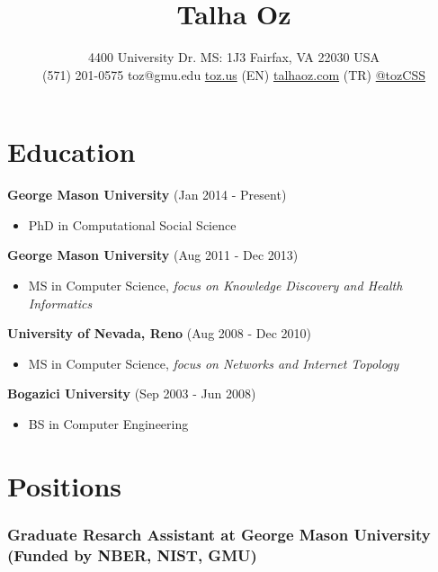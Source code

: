 \documentclass[11pt, letter]{article}
\title{Talha Oz}
\author{4400 University Dr. MS: 1J3 Fairfax, VA 22030 USA\\ 
(571) 201-0575 \textbar{} toz@gmu.edu \textbar{}
\href{http://toz.us}{toz.us} (EN) \textbar{}
\href{http://talhaoz.com}{talhaoz.com} (TR) \textbar{}
\href{http://twitter.com/tozCSS}{@tozCSS} }
\date{} %
\begin{document}
\maketitle
\begin{raggedright}
\vspace{-15mm}
\section{Education}\label{education}

\textbf{George Mason University} (Jan 2014 - Present)

\begin{itemize}
\itemsep1pt\parskip0pt
\item
  PhD in Computational Social Science
\end{itemize}

\textbf{George Mason University} (Aug 2011 - Dec 2013)

\begin{itemize}
\itemsep1pt\parskip0pt
\item
  MS in Computer Science, \emph{focus on Knowledge Discovery and Health
  Informatics}
\end{itemize}

\textbf{University of Nevada, Reno} (Aug 2008 - Dec 2010)

\begin{itemize}
\itemsep1pt\parskip0pt
\item
  MS in Computer Science, \emph{focus on Networks and Internet Topology}
\end{itemize}

\textbf{Bogazici University} (Sep 2003 - Jun 2008)

\begin{itemize}
\itemsep1pt\parskip0pt
\item
  BS in Computer Engineering
\end{itemize}

\section{Positions}\label{positions}

\subsubsection{Graduate Resarch Assistant at George Mason University
(Funded by NBER, NIST,
GMU)}\label{graduate-resarch-assistant-at-george-mason-university-funded-by-nber-nist-gmu}


\end{raggedright}
\end{document}
